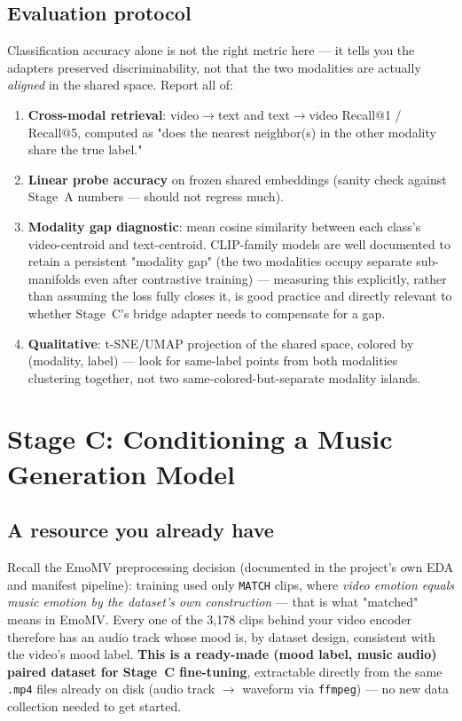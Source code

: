 \documentclass[11pt]{article}
\begin{document}
\subsection{Evaluation protocol}
\label{sec:eval}
Classification accuracy alone is not the right metric here — it tells you the adapters preserved
discriminability, not that the two modalities are actually \emph{aligned} in the shared space.
Report all of:
\begin{enumerate}
\item \textbf{Cross-modal retrieval}: video$\to$text and text$\to$video Recall@1 / Recall@5,
computed as "does the nearest neighbor(s) in the other modality share the true label."
\item \textbf{Linear probe accuracy} on frozen shared embeddings (sanity check against Stage~A
numbers — should not regress much).
\item \textbf{Modality gap diagnostic}: mean cosine similarity between each class's video-centroid
and text-centroid. CLIP-family models are well documented to retain a persistent "modality gap"
(the two modalities occupy separate sub-manifolds even after contrastive training) — measuring
this explicitly, rather than assuming the loss fully closes it, is good practice and directly
relevant to whether Stage~C's bridge adapter needs to compensate for a gap.
\item \textbf{Qualitative}: t-SNE/UMAP projection of the shared space, colored by (modality,
label) — look for same-label points from both modalities clustering together, not two
same-colored-but-separate modality islands.
\end{enumerate}

\section{Stage C: Conditioning a Music Generation Model}
\label{sec:musicgen}

\subsection{A resource you already have}
Recall the EmoMV preprocessing decision (documented in the project's own EDA and manifest
pipeline): training used only \texttt{MATCH} clips, where \emph{video emotion equals music
emotion by the dataset's own construction} — that is what "matched" means in EmoMV. Every one of
the 3{,}178 clips behind your video encoder therefore has an audio track whose mood is, by
dataset design, consistent with the video's mood label. \textbf{This is a ready-made
(mood label, music audio) paired dataset for Stage~C fine-tuning}, extractable directly from the
same \texttt{.mp4} files already on disk (audio track $\to$ waveform via \texttt{ffmpeg}) — no
new data collection needed to get started.
\end{document}
